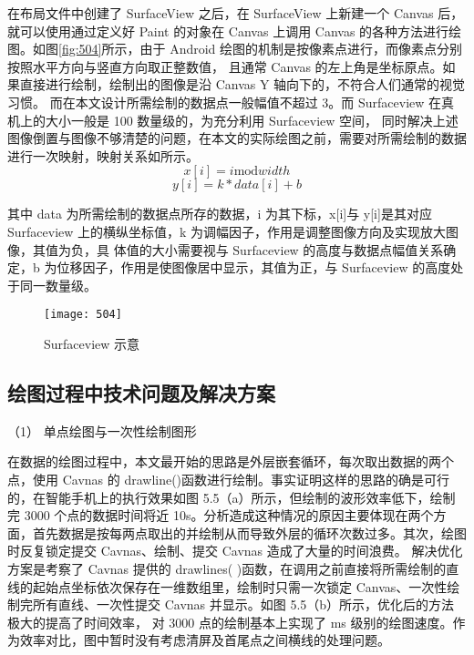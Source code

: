 在布局文件中创建了 SurfaceView 之后，在 SurfaceView 上新建一个 Canvas 后，就可以使用通过定义好 Paint 的对象在 Canvas 上调用 
Canvas 的各种方法进行绘图。如图\autoref{fig:504}所示，由于 Android 绘图的机制是按像素点进行，而像素点分别按照水平方向与竖直方向取正整数值，
且通常 Canvas 的左上角是坐标原点。如果直接进行绘制，绘制出的图像是沿 Canvas Y 轴向下的，不符合人们通常的视觉习惯。
而在本文设计所需绘制的数据点一般幅值不超过 3。而 Surfaceview 在真机上的大小一般是 100 数量级的，为充分利用 Surfaceview 空间，
同时解决上述图像倒置与图像不够清楚的问题，在本文的实际绘图之前，需要对所需绘制的数据进行一次映射，映射关系如所示。 
\begin{equation}
    \label{equ:501}
    x[i]= i \text{mod} width
\end{equation}
\begin{equation}
    \label{equ:502}
    y[i]= k * data[i] + b
\end{equation}

其中 data 为所需绘制的数据点所存的数据，i 为其下标，x[i]与 y[i]是其对应 Surfaceview 上的横纵坐标值，k 为调幅因子，作用是调整图像方向及实现放大图像，其值为负，具 
体值的大小需要视与 Surfaceview 的高度与数据点幅值关系确定，b 为位移因子，作用是使图像居中显示，其值为正，与 Surfaceview 的高度处于同一数量级。 
\begin{figure}[htbp]
    \centering
    \texttt{[image: 504]}
    \caption{\label{fig:504}Surfaceview 示意}
\end{figure}

\subsection{绘图过程中技术问题及解决方案} 

（1）	单点绘图与一次性绘制图形 

在数据的绘图过程中，本文最开始的思路是外层嵌套循环，每次取出数据的两个点，使用 Cavnas 的 drawline()函数进行绘制。事实证明这样的思路的确是可行的，在智能手机上的执行效果如图 5.5（a）所示，但绘制的波形效率低下，绘制完 3000 个点的数据时间将近 10s。分析造成这种情况的原因主要体现在两个方面，首先数据是按每两点取出的并绘制从而导致外层的循环次数过多。其次，绘图时反复锁定提交 Cavnas、绘制、提交 Cavnas 造成了大量的时间浪费。 
解决优化方案是考察了 Cavnas 提供的 drawlines( )函数，在调用之前直接将所需绘制的直线的起始点坐标依次保存在一维数组里，绘制时只需一次锁定 Canvas、一次性绘制完所有直线、一次性提交 Cavnas 并显示。如图 5.5（b）所示，优化后的方法极大的提高了时间效率， 对 3000 点的绘制基本上实现了 ms 级别的绘图速度。作为效率对比，图中暂时没有考虑清屏及首尾点之间横线的处理问题。
